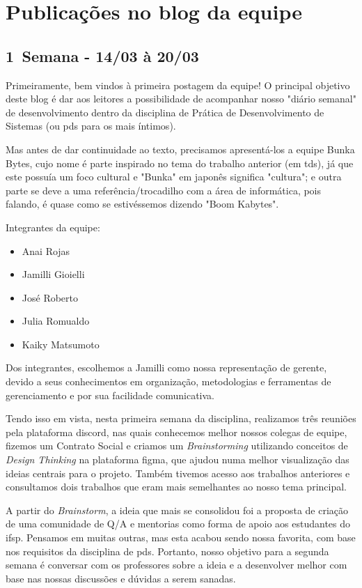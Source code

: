 \chapter{Publicações no blog da equipe}
\label{postsBlog}
\section{1\textordfeminine \, Semana - 14/03 à 20/03}

Primeiramente, bem vindos à primeira postagem da equipe! O principal objetivo deste blog é dar aos leitores a possibilidade de acompanhar nosso "diário semanal" de desenvolvimento dentro da disciplina de Prática de Desenvolvimento de Sistemas (ou \acs{pds} para os mais íntimos).

Mas antes de dar continuidade ao texto, precisamos apresentá-los a equipe Bunka Bytes, cujo nome é parte inspirado no tema do trabalho anterior (em \acs{tds}), já que este possuía um foco cultural e "Bunka" em japonês significa "cultura"; e outra parte se deve a uma referência/trocadilho com a área de informática, pois falando, é quase como se estivéssemos dizendo "Boom Kabytes". 

Integrantes da equipe:

\begin{itemize}
    \item Anai Rojas
    \item Jamilli Gioielli
    \item José Roberto
    \item Julia Romualdo
    \item Kaiky Matsumoto
\end{itemize}

Dos integrantes, escolhemos a Jamilli como nossa representação de gerente, devido a seus conhecimentos em organização, metodologias e ferramentas de gerenciamento e por sua facilidade comunicativa. 

Tendo isso em vista, nesta primeira semana da disciplina, realizamos três reuniões pela plataforma \gls{discord}, nas quais conhecemos melhor nossos colegas de equipe, fizemos um Contrato Social e criamos um \textsl{Brainstorming} utilizando conceitos de \textsl{Design Thinking} na plataforma \gls{figma}, que ajudou numa melhor visualização das ideias centrais para o projeto.  Também tivemos acesso aos trabalhos anteriores e consultamos dois trabalhos que eram mais semelhantes ao nosso tema principal. 

A partir do \textsl{Brainstorm}, a ideia que mais se consolidou foi a proposta de criação de uma comunidade de \acs{Q/A} e mentorias como forma de apoio aos estudantes do \acs{ifsp}. Pensamos em muitas outras, mas esta acabou sendo nossa favorita, com base nos requisitos da disciplina de \acs{pds}. Portanto, nosso objetivo para a segunda semana é conversar com os professores sobre a ideia e a desenvolver melhor com base nas nossas discussões e dúvidas a serem sanadas.

